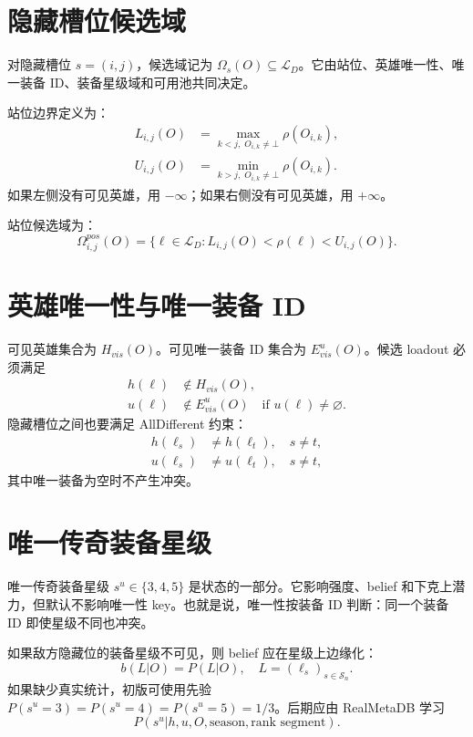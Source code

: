 \documentclass[UTF8,12pt,openany]{ctexbook}
\newcommand{\Lcal}{\mathcal{L}}
\newcommand{\Scal}{\mathcal{S}}
\begin{document}
\section{隐藏槽位候选域}
对隐藏槽位 $s=(i,j)$，候选域记为 $\Omega_s(O)\subseteq\Lcal_D$。它由站位、英雄唯一性、唯一装备 ID、装备星级域和可用池共同决定。

站位边界定义为：
\begin{align}
L_{i,j}(O)&=\max_{k<j,\;O_{i,k}\ne\bot}\rho(O_{i,k}),\\
U_{i,j}(O)&=\min_{k>j,\;O_{i,k}\ne\bot}\rho(O_{i,k}).
\end{align}
如果左侧没有可见英雄，用 $-\infty$；如果右侧没有可见英雄，用 $+\infty$。

站位候选域为：
\begin{equation}
\Omega^{pos}_{i,j}(O)=\{\ell\in\Lcal_D: L_{i,j}(O)<\rho(\ell)<U_{i,j}(O)\}.
\end{equation}

\section{英雄唯一性与唯一装备 ID}
可见英雄集合为 $H_{vis}(O)$。可见唯一装备 ID 集合为 $E^u_{vis}(O)$。候选 loadout 必须满足
\begin{align}
h(\ell)&\notin H_{vis}(O),\\
u(\ell)&\notin E^u_{vis}(O)\quad \text{if }u(\ell)\ne\varnothing.
\end{align}
隐藏槽位之间也要满足 AllDifferent 约束：
\begin{align}
h(\ell_s)&\ne h(\ell_t),\quad s\ne t,\\
u(\ell_s)&\ne u(\ell_t),\quad s\ne t,
\end{align}
其中唯一装备为空时不产生冲突。

\section{唯一传奇装备星级}
唯一传奇装备星级 $s^u\in\{3,4,5\}$ 是状态的一部分。它影响强度、belief 和下克上潜力，但默认不影响唯一性 key。也就是说，唯一性按装备 ID 判断：同一个装备 ID 即使星级不同也冲突。

如果敌方隐藏位的装备星级不可见，则 belief 应在星级上边缘化：
\begin{equation}
b(L|O)=P(L|O),\quad L=(\ell_s)_{s\in\Scal_n}.
\end{equation}
如果缺少真实统计，初版可使用先验 $P(s^u=3)=P(s^u=4)=P(s^u=5)=1/3$。后期应由 RealMetaDB 学习
\begin{equation}
P(s^u|h,u,O,\text{season},\text{rank segment}).
\end{equation}
\end{document}
